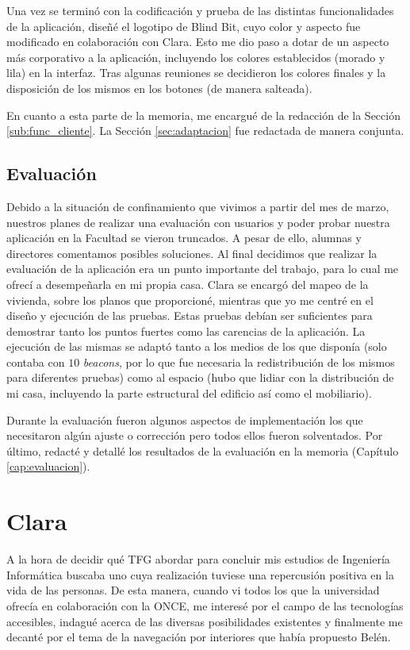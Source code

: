 Una vez se terminó con la codificación y prueba de las distintas funcionalidades de la aplicación, diseñé el logotipo de Blind Bit, cuyo color y aspecto fue modificado en colaboración con Clara. Esto me dio paso a dotar de un aspecto más corporativo a la aplicación, incluyendo los colores establecidos (morado y lila) en la interfaz. Tras algunas reuniones se decidieron los colores finales y la disposición de los mismos en los botones (de manera salteada).

En cuanto a esta parte de la memoria, me encargué de la redacción de la Sección \ref{sub:func_cliente}. La Sección \ref{sec:adaptacion} fue redactada de manera conjunta.

\subsection{Evaluación}

Debido a la situación de confinamiento que vivimos a partir del mes de marzo, nuestros planes de realizar una evaluación con usuarios y poder probar nuestra aplicación en la Facultad se vieron truncados. A pesar de ello, alumnas y directores comentamos posibles soluciones. Al final decidimos que realizar la evaluación de la aplicación era un punto importante del trabajo, para lo cual me ofrecí a desempeñarla en mi propia casa. Clara se encargó del mapeo de la vivienda, sobre los planos que proporcioné, mientras que yo me centré en el diseño y ejecución de las pruebas. Estas pruebas debían ser suficientes para demostrar tanto los puntos fuertes como las carencias de la aplicación. La ejecución de las mismas se adaptó tanto a los medios de los que disponía (solo contaba con $10$ \textit{beacons}, por lo que fue necesaria la redistribución de los mismos para diferentes pruebas) como al espacio (hubo que lidiar con la distribución de mi casa, incluyendo la parte estructural del edificio así como el mobiliario).

Durante la evaluación fueron algunos aspectos de implementación los que necesitaron algún ajuste o corrección pero todos ellos fueron solventados. Por último, redacté y detallé los resultados de la evaluación en la memoria (Capítulo \ref{cap:evaluacion}).


\section{Clara}
\label{sec:trabajoClara}

A la hora de decidir qué TFG abordar para concluir mis estudios de Ingeniería Informática buscaba uno cuya realización tuviese una repercusión positiva en la vida de las personas. De esta manera, cuando vi todos los que la universidad ofrecía en colaboración con la ONCE, me interesé por el campo de las tecnologías accesibles, indagué acerca de las diversas posibilidades existentes y finalmente me decanté por el tema de la navegación por interiores que había propuesto Belén.

